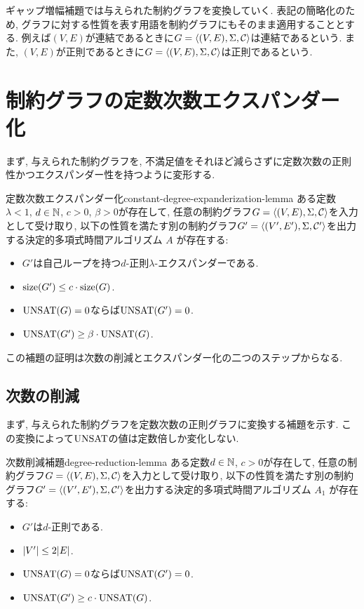 ギャップ増幅補題では与えられた制約グラフを変換していく.
表記の簡略化のため, グラフに対する性質を表す用語を制約グラフにもそのまま適用することとする.
例えば$(V,E)$が連結であるときに$G=\langle(V,E),\Sigma,\mathcal{C}\rangle$は連結であるという.
また, $(V,E)$が正則であるときに$G=\langle(V,E),\Sigma,\mathcal{C}\rangle$は正則であるという.


\section{制約グラフの定数次数エクスパンダー化}

まず, 与えられた制約グラフを, 不満足値をそれほど減らさずに定数次数の正則性かつエクスパンダー性を持つように変形する.

\begin{lemma}{定数次数エクスパンダー化}{constant-degree-expanderization-lemma}
  ある定数$\lambda<1$, $d\in\mathbb{N}$, $c>0$, $\beta>0$が存在して,
  任意の制約グラフ$G=\langle(V,E),\Sigma,\mathcal{C}\rangle$を入力として受け取り, 以下の性質を満たす別の制約グラフ$G'=\langle(V',E'),\Sigma,\mathcal{C}'\rangle$を出力する決定的多項式時間アルゴリズム $A$ が存在する:
  \begin{itemize}
    \item $G'$は自己ループを持つ$d$-正則$\lambda$-エクスパンダーである.
    \item $\mathrm{size}(G') \le c\cdot \mathrm{size}(G)$.
    \item $\mathrm{UNSAT}(G)=0$ならば$\mathrm{UNSAT}(G')=0$.
    \item $\mathrm{UNSAT}(G') \ge \beta\cdot\mathrm{UNSAT}(G)$.
  \end{itemize}
\end{lemma}

この補題の証明は次数の削減とエクスパンダー化の二つのステップからなる.

\subsection{次数の削減}

まず, 与えられた制約グラフを定数次数の正則グラフに変換する補題を示す.
この変換によって$\mathrm{UNSAT}$の値は定数倍しか変化しない.

\begin{lemma}{次数削減補題}{degree-reduction-lemma}
  ある定数$d\in\mathbb{N}$, $c>0$が存在して, 任意の制約グラフ$G=\langle(V,E),\Sigma,\mathcal{C}\rangle$を入力として受け取り, 以下の性質を満たす別の制約グラフ$G'=\langle(V',E'),\Sigma,\mathcal{C}'\rangle$を出力する決定的多項式時間アルゴリズム $A_1$ が存在する:
  \begin{itemize}
    \item $G'$は$d$-正則である.
    \item $\abs{V'} \le 2\abs{E}$.
    \item $\mathrm{UNSAT}(G)=0$ならば$\mathrm{UNSAT}(G')=0$.
    \item $\mathrm{UNSAT}(G') \ge c\cdot \mathrm{UNSAT}(G)$.
  \end{itemize}
\end{lemma}

